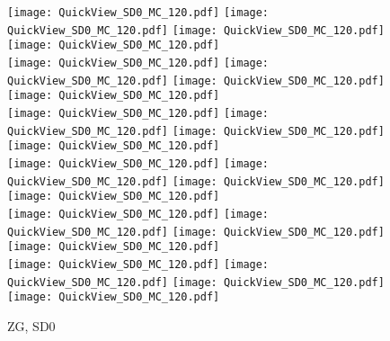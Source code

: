 \documentclass[amsmath,amssymb,aps,floatfix]{revtex4-1}
\begin{document}
\begin{figure}
   \centering
   \texttt{[image: QuickView\_SD0\_MC\_120.pdf]}
   \texttt{[image: QuickView\_SD0\_MC\_120.pdf]}
   \texttt{[image: QuickView\_SD0\_MC\_120.pdf]}
   \texttt{[image: QuickView\_SD0\_MC\_120.pdf]}\\
   \texttt{[image: QuickView\_SD0\_MC\_120.pdf]}
   \texttt{[image: QuickView\_SD0\_MC\_120.pdf]}
   \texttt{[image: QuickView\_SD0\_MC\_120.pdf]}
   \texttt{[image: QuickView\_SD0\_MC\_120.pdf]}\\
   \texttt{[image: QuickView\_SD0\_MC\_120.pdf]}
   \texttt{[image: QuickView\_SD0\_MC\_120.pdf]}
   \texttt{[image: QuickView\_SD0\_MC\_120.pdf]}
   \texttt{[image: QuickView\_SD0\_MC\_120.pdf]}\\
   \texttt{[image: QuickView\_SD0\_MC\_120.pdf]}
   \texttt{[image: QuickView\_SD0\_MC\_120.pdf]}
   \texttt{[image: QuickView\_SD0\_MC\_120.pdf]}
   \texttt{[image: QuickView\_SD0\_MC\_120.pdf]}\\
   \texttt{[image: QuickView\_SD0\_MC\_120.pdf]}
   \texttt{[image: QuickView\_SD0\_MC\_120.pdf]}
   \texttt{[image: QuickView\_SD0\_MC\_120.pdf]}
   \texttt{[image: QuickView\_SD0\_MC\_120.pdf]}\\
   \texttt{[image: QuickView\_SD0\_MC\_120.pdf]}
   \texttt{[image: QuickView\_SD0\_MC\_120.pdf]}
   \texttt{[image: QuickView\_SD0\_MC\_120.pdf]}
   \texttt{[image: QuickView\_SD0\_MC\_120.pdf]}\\
   \caption{ZG, SD0}
   \label{Figure:SD0Result}
\end{figure}
\end{document}
